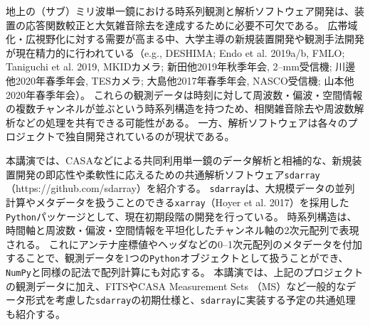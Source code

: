 \documentclass[ja]{2020a}
\begin{document}

地上の（サブ）ミリ波単一鏡における時系列観測と解析ソフトウェア開発は、装置の応答関数較正と大気雑音除去を達成するために必要不可欠である。
広帯域化・広視野化に対する需要が高まる中、大学主導の新規装置開発や観測手法開発が現在精力的に行われている（e.g., DESHIMA; Endo et al. 2019a/b, FMLO; Taniguchi et al. 2019, MKIDカメラ; 新田他2019年秋季年会, 2--mm受信機; 川邊他2020年春季年会, TESカメラ; 大島他2017年春季年会, NASCO受信機; 山本他2020年春季年会）。
これらの観測データは時刻に対して周波数・偏波・空間情報の複数チャンネルが並ぶという時系列構造を持つため、相関雑音除去や周波数解析などの処理を共有できる可能性がある。
一方、解析ソフトウェアは各々のプロジェクトで独自開発されているのが現状である。

本講演では、CASAなどによる共同利用単一鏡のデータ解析と相補的な、新規装置開発の即応性や柔軟性に応えるための共通解析ソフトウェア\texttt{sdarray}（https://github.com/sdarray）を紹介する。
\texttt{sdarray}は、大規模データの並列計算やメタデータを扱うことのできる\texttt{xarray}（Hoyer et al. 2017）を採用した\texttt{Python}パッケージとして、現在初期段階の開発を行っている。
時系列構造は、時間軸と周波数・偏波・空間情報を平坦化したチャンネル軸の2次元配列で表現される。
これにアンテナ座標値やヘッダなどの0--1次元配列のメタデータを付加することで、観測データを1つの\texttt{Python}オブジェクトとして扱うことができ、\texttt{NumPy}と同様の記法で配列計算にも対応する。
本講演では、上記のプロジェクトの観測データに加え、FITSやCASA Measurement Sets （MS）など一般的なデータ形式を考慮した\texttt{sdarray}の初期仕様と、\texttt{sdarray}に実装する予定の共通処理も紹介する。

\end{document}
